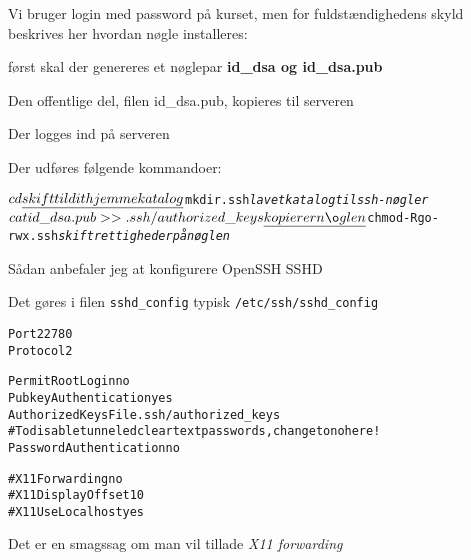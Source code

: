 \documentclass[Screen16to9,17pt]{foils}
\begin{document}
\begin{list1}
\item Vi bruger login med password på kurset, men for
  fuldstændighedens skyld beskrives her hvordan nøgle installeres:

\begin{list2}
\item først skal der genereres et nøglepar {\bfseries id\_dsa og id\_dsa.pub}
\item Den offentlige del, filen id\_dsa.pub, kopieres til serveren
\item Der logges ind på serveren
\item Der udføres følgende kommandoer:
\end{list2}
\end{list1}
\begin{alltt}
$ cd  \emph{skift til dit hjemmekatalog}
$ mkdir .ssh  \emph{lav et katalog til ssh-nøgler}
$ cat id\_dsa.pub >> .ssh/authorized\_keys  \emph{kopierer nøglen}
$ chmod -R go-rwx .ssh  \emph{skift rettigheder på nøglen}
\end{alltt}



\begin{list1}
\item Sådan anbefaler jeg at konfigurere OpenSSH SSHD
\item Det gøres i filen \verb+sshd_config+ typisk \verb+/etc/ssh/sshd_config+
\end{list1}

\begin{alltt}
\small
Port 22780
Protocol 2

PermitRootLogin no
PubkeyAuthentication yes
AuthorizedKeysFile      .ssh/authorized_keys
# To disable tunneled clear text passwords, change to no here!
PasswordAuthentication no

#X11Forwarding no
#X11DisplayOffset 10
#X11UseLocalhost yes
\end{alltt}

Det er en smagssag om man vil tillade \emph{X11 forwarding}






\end{document}
